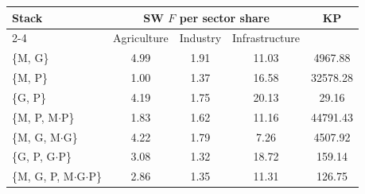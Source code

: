 \begin{tabular}{@{}lcccc@{}}
\toprule
Stack & \multicolumn{3}{c}{SW $F$ per sector share} & KP \\
\cmidrule(lr){2-4}
 & Agriculture & Industry & Infrastructure & \\
\midrule
\{M, G\} & 4.99 & 1.91 & 11.03 & 4967.88 \\
\{M, P\} & 1.00 & 1.37 & 16.58 & 32578.28 \\
\{G, P\} & 4.19 & 1.75 & 20.13 & 29.16 \\
\addlinespace
\{M, P, M$\cdot$P\} & 1.83 & 1.62 & 11.16 & 44791.43 \\
\{M, G, M$\cdot$G\} & 4.22 & 1.79 & 7.26 & 4507.92 \\
\{G, P, G$\cdot$P\} & 3.08 & 1.32 & 18.72 & 159.14 \\
\{M, G, P, M$\cdot$G$\cdot$P\} & 2.86 & 1.35 & 11.31 & 126.75 \\
\bottomrule
\end{tabular}
